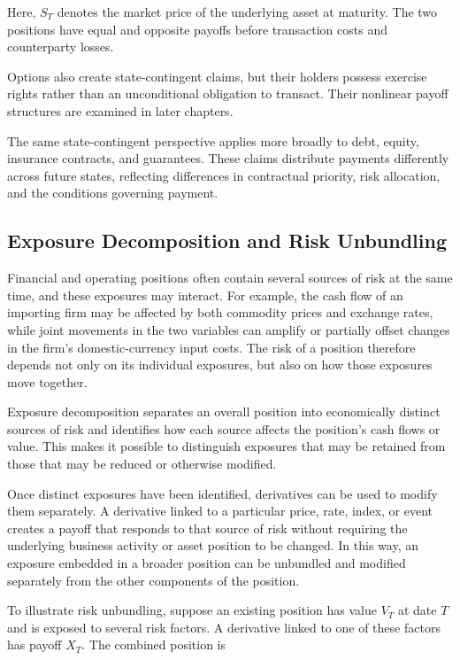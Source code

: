 Here, $S_T$ denotes the market price of the underlying
asset at maturity. The two positions have equal and
opposite payoffs before transaction costs and
counterparty losses.

Options also create state-contingent claims, but
their holders possess exercise rights rather than
an unconditional obligation to transact. Their
nonlinear payoff structures are examined in
later chapters.

The same state-contingent perspective applies more
broadly to debt, equity, insurance contracts, and
guarantees. These claims distribute payments
differently across future states, reflecting
differences in contractual priority, risk allocation,
and the conditions governing payment.

\subsection{Exposure Decomposition and Risk Unbundling}

Financial and operating positions often contain several sources of risk at the same time, and these exposures may interact. For example, the cash flow of an importing firm may be affected by both commodity prices and exchange rates, while joint movements in the two variables can amplify or partially offset changes in the firm's domestic-currency input costs. The risk of a position therefore depends not only on its individual exposures, but also on how those exposures move together.

Exposure decomposition separates an overall position into economically distinct sources of risk and identifies how each source affects the position's cash flows or value. This makes it possible to distinguish exposures that may be retained from those that may be reduced or otherwise modified.

Once distinct exposures have been identified, derivatives can be used to modify them separately. A derivative linked to a particular price, rate, index, or event creates a payoff that responds to that source of risk without requiring the underlying business activity or asset position to be changed. In this way, an exposure embedded in a broader position can be unbundled and modified separately from the other components of the position.

To illustrate risk unbundling, suppose an existing position has value $V_T$ at date $T$ and is exposed to several risk factors. A derivative linked to one of these factors has payoff $X_T$. The combined position is

